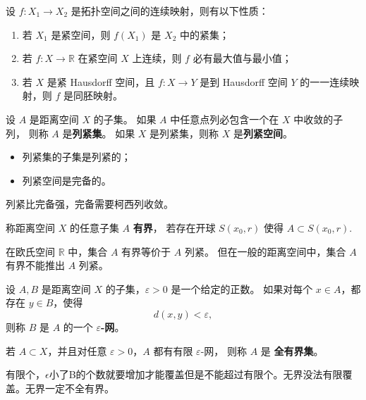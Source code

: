 \begin{theorem}[紧空间的连续映射性质]
设 $f:X_1\to X_2$ 是拓扑空间之间的连续映射，则有以下性质：

\begin{enumerate}
\item 若 $X_1$ 是紧空间，则 $f(X_1)$ 是 $X_2$ 中的紧集；
  
\item 若 $f:X\to \mathbb{R}$ 在紧空间 $X$ 上连续，则 $f$ 必有最大值与最小值；
  
\item 若 $X$ 是紧 Hausdorff 空间，且 $f:X\to Y$ 是到 Hausdorff 空间 $Y$ 的一一连续映射，则 $f$ 是同胚映射。
\end{enumerate}
\end{theorem}

\begin{definition}[列紧]
设 $A$ 是距离空间 $X$ 的子集。  
如果 $A$ 中任意点列必包含一个在 $X$ 中收敛的子列，  
则称 $A$ 是\textbf{列紧集}。  
如果 $X$ 是列紧集，则称 $X$ 是\textbf{列紧空间}。
\end{definition}

\begin{remark}
\begin{itemize}
  \item 列紧集的子集是列紧的；
  \item 列紧空间是完备的。
\end{itemize}
\end{remark}
列紧比完备强，完备需要柯西列收敛。
\begin{definition}[有界集]
称距离空间 $X$ 的任意子集 $A$ \textbf{有界}，  
若存在开球 $S(x_0, r)$ 使得
$
A \subset S(x_0, r).
$
\end{definition}

\begin{remark}
在欧氏空间 $\mathbb{R}$ 中，集合 $A$ 有界等价于 $A$ 列紧。  
但在一般的距离空间中，集合 $A$ 有界不能推出 $A$ 列紧。
\end{remark}

\begin{definition}
设 $A,B$ 是距离空间 $X$ 的子集，$\varepsilon>0$ 是一个给定的正数。  
如果对每个 $x\in A$，都存在 $y\in B$，使得
\[
d(x,y)<\varepsilon,
\]
则称 $B$ 是 $A$ 的一个 \textbf{$\varepsilon$-网}。

若 $A\subset X$，并且对任意 $\varepsilon>0$，$A$ 都有有限 $\varepsilon$-网，  
则称 $A$ 是 \textbf{全有界集}。
\end{definition}
有限个，$\epsilon$小了B的个数就要增加才能覆盖但是不能超过有限个。无界没法有限覆盖。无界一定不全有界。

